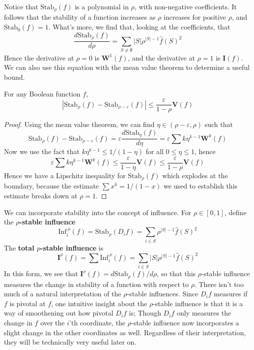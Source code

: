 Notice that $\text{Stab}_\rho(f)$ is a polynomial in $\rho$, with non-negative coefficients. It follows that the stability of a function increases as $\rho$ increases for positive $\rho$, and $\text{Stab}_0(f) = 1$. What's more, we find that, looking at the coefficients, that
%
\[ \frac{d\text{Stab}_\rho(f)}{d\rho} = \sum_{S \neq \emptyset} |S| \rho^{|S| - 1} \widehat{f}(S)^2 \]
%
Hence the derivative at $\rho = 0$ is $\mathbf{W}^1(f)$, and the derivative at $\rho = 1$ is $\mathbf{I}(f)$. We can also use this equation with the mean value theorem to determine a useful bound.

\begin{theorem}
    For any Boolean function $f$,
    \[ |\text{Stab}_\rho(f) - \text{Stab}_{\rho - \varepsilon}(f)| \leq \frac{\varepsilon}{1 - \rho} \mathbf{V}(f) \]
\end{theorem}
\begin{proof}
    Using the mean value theorem, we can find $\eta \in (\rho - \varepsilon, \rho)$ such that
    \[ \text{Stab}_\rho(f) - \text{Stab}_{\rho - \varepsilon}(f) = \varepsilon \frac{d \text{Stab}_\eta(f)}{d \eta} = \varepsilon \sum k \eta^{k - 1} \mathbf{W}^k(f) \]
    Now we use the fact that $k \eta^{k-1} \leq 1/(1 - \eta)$ for all $0 \leq \eta \leq 1$, hence
    \[ \varepsilon \sum k \eta^{k-1} \mathbf{W}^k(f) \leq \frac{\varepsilon}{1 - \eta} \mathbf{V}(f) \leq \frac{\varepsilon}{1 - \rho} \mathbf{V}(f) \]
    Hence we have a Lipschitz inequality for $\text{Stab}_\rho(f)$ which explodes at the boundary, because the estimate $\sum x^k = 1/(1 - x)$ we used to establish this estimate breaks down at $\rho = 1$.
\end{proof}

We can incorporate stability into the concept of influence. For $\rho \in [0,1]$, define the {\bf $\rho$-stable influence}
%
\[ \text{Inf}_i^{\ \rho}(f) = \text{Stab}_\rho(D_i f) = \sum_{i \in S} \rho^{|S| - 1} \widehat{f}(S)^2 \]
%
The {\bf total $p$-stable influence} is
%
\[ \mathbf{I}^{\rho}(f) = \sum \text{Inf}_i^{\ \rho}(f) = \sum_{i \in S} |S| \rho^{|S|-1} \widehat{f}(S)^2 \]
%
In this form, we see that $\mathbf{I}^{\rho}(f) = d\text{Stab}_\rho(f)/d\rho$, so that this $\rho$-stable influence measures the change in stability of a function with respect to $\rho$. There isn't too much of a natural interpretation of the $\rho$-stable influences. Since $D_if$ measures if $f$ is pivotal at $f$, one intuitive insight about the $\rho$-stable influence is that it is a way of smoothening out how pivotal $D_if$ is; Though $D_if$ only measures the change in $f$ over the $i$'th coordinate, the $\rho$-stable influence now incorporates a slight change in the other coordinates as well. Regardless of their interpretation, they will be technically very useful later on.

